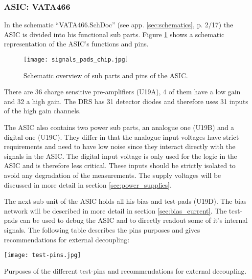 \subsubsection{ASIC: VATA466}
\label{sec:asic}
In the schematic ``VATA466.SchDoc'' (see app. \ref{sec:schematics}, p. 2/17) the ASIC is divided into his functional sub parts.
Figure \ref{fig:signals_pads} shows a schematic representation of the ASIC's functions and pins.
\begin{figure}[H]
    \centering
    \texttt{[image: signals\_pads\_chip.jpg]}
    \caption[Signals and Chip Pad Frame]{Schematic overview of sub parts and pins of the ASIC.\cite[p. 14, fig. 3]{Meier2016VATA466}}
    \label{fig:signals_pads}
\end{figure}

There are 36 charge sensitive pre-amplifiers (U19A), 4 of them have a low gain and 32 a high gain.
The DRS has 31 detector diodes and therefore uses 31 inputs of the high gain channels.

The ASIC also contains two power sub parts, an analogue one (U19B) and a digital one (U19C).
They differ in that the analogue input voltages have strict requirements and need to have low noise since they interact directly with the signals in the ASIC.
The digital input voltage is only used for the logic in the ASIC and is therefore less critical.
These inputs should be strictly isolated to avoid any degradation of the measurements.
The supply voltages will be discussed in more detail in section \ref{sec:power_supplies}.

The next sub unit of the ASIC holds all his bias and test-pads (U19D).
The bias network will be described in more detail in section \ref{sec:bias_current}.
The test-pads can be used to debug the ASIC and to directly readout some of it's internal signals.
The following table describes the pins purposes and gives recommendations for external decoupling:
\begin{table}[H]
	\centering
    \texttt{[image: test-pins.jpg]}
    \caption[Test-pins Purpose and External Decoupling]{Purposes of the different test-pins and recommendations for external decoupling.\cite[p. 65-66, tab. 31]{Meier2016VATA466}}
	\label{tab:test-pads}
\end{table}

